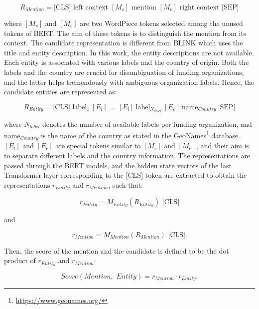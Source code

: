 \documentclass{report}
\theoremstyle{definition}
\theoremstyle{remark}
\begin{document}
\begin{equation}
    R_{Mention} = \text{[CLS]} \text{ left context } [M_s] \text{ mention }  [M_e] \text{ right context } \text{[SEP]}
\end{equation}

\noindent where $[M_s]$ and $[M_e]$ are two WordPiece tokens selected among the unused tokens of BERT. The aim of these tokens is to distinguish the mention from its context. 
The candidate representation is different from BLINK which uses the title and entity description. In this work, the entity descriptions are not available. Each entity is associated with various labels and the country of origin. Both the labels and the country are crucial for disambiguation of funding organizations, and the latter helps tremendously with ambiguous organization labels. Hence, the candidate entities are represented as:

\begin{equation}
    R_{Entity} = \text{[CLS] } \text{label}_{1} \ [E_l] \text{ ... } [E_l] \ \text{label}_{N_{label}} \ [E_c] \ \text{name}_{Country} \ \text{[SEP]}
\end{equation}

\noindent where $N_{label}$ denotes the number of available labels per funding organization, and $\text{name}_{Country}$ is the name of the country as stated in the GeoNames\footnote{\url{https://www.geonames.org/}} database. $[E_l]$ and $[E_c]$ are special tokens similar to $[M_s]$ and $[M_e]$, and their aim is to separate different labels and the country information. The representations are passed through the BERT models, and the hidden state vectors of the last Transformer layer corresponding to the [CLS] token are extracted to obtain the representations $r_{Entity}$ and $r_{Mention}$, such that:

\begin{equation}
    r_{Entity} = M_{Entity}(R_{Entity}) \text{ [CLS]}
\end{equation}

and 

\begin{equation}
    r_{Mention} = M_{Mention}(R_{Mention})\text{ [CLS].}
\end{equation}

\noindent Then, the score of the mention and the candidate is defined to be the dot product of $r_{Entity}$ and $r_{Mention}$:

\begin{equation}
    Score(\textit{Mention},\textit{ Entity}) = r_{Mention} \cdot r_{Entity}.
\end{equation}
\end{document}
